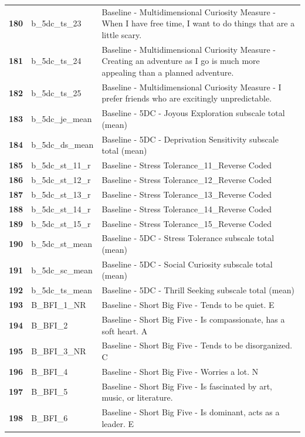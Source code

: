 \documentclass[
  letterpaper,
  DIV=11,
  numbers=noendperiod]{scrartcl}
\begin{document}
\begin{longtable}[t]{>{}cll}
\textbf{180} & b\_5dc\_ts\_23 & Baseline - Multidimensional Curiosity Measure - When I have free time, I want to do things that are a little scary.\\
\addlinespace
\textbf{181} & b\_5dc\_ts\_24 & Baseline - Multidimensional Curiosity Measure - Creating an adventure as I go is much more appealing than a planned adventure.\\
\textbf{182} & b\_5dc\_ts\_25 & Baseline - Multidimensional Curiosity Measure - I prefer friends who are excitingly unpredictable.\\
\textbf{183} & b\_5dc\_je\_mean & Baseline - 5DC - Joyous Exploration subscale total (mean)\\
\textbf{184} & b\_5dc\_ds\_mean & Baseline - 5DC - Deprivation Sensitivity subscale total (mean)\\
\textbf{185} & b\_5dc\_st\_11\_r & Baseline - Stress Tolerance\_11\_Reverse Coded\\
\addlinespace
\textbf{186} & b\_5dc\_st\_12\_r & Baseline - Stress Tolerance\_12\_Reverse Coded\\
\textbf{187} & b\_5dc\_st\_13\_r & Baseline - Stress Tolerance\_13\_Reverse Coded\\
\textbf{188} & b\_5dc\_st\_14\_r & Baseline - Stress Tolerance\_14\_Reverse Coded\\
\textbf{189} & b\_5dc\_st\_15\_r & Baseline - Stress Tolerance\_15\_Reverse Coded\\
\textbf{190} & b\_5dc\_st\_mean & Baseline - 5DC - Stress Tolerance subscale total (mean)\\
\addlinespace
\textbf{191} & b\_5dc\_sc\_mean & Baseline - 5DC - Social Curiosity subscale total (mean)\\
\textbf{192} & b\_5dc\_ts\_mean & Baseline - 5DC - Thrill Seeking subscale total (mean)\\
\textbf{193} & B\_BFI\_1\_NR & Baseline - Short Big Five - Tends to be quiet. E\\
\textbf{194} & B\_BFI\_2 & Baseline - Short Big Five - Is compassionate, has a soft heart. A\\
\textbf{195} & B\_BFI\_3\_NR & Baseline - Short Big Five - Tends to be disorganized. C\\
\addlinespace
\textbf{196} & B\_BFI\_4 & Baseline - Short Big Five - Worries a lot. N\\
\textbf{197} & B\_BFI\_5 & Baseline - Short Big Five - Is fascinated by art, music, or literature.\\
\textbf{198} & B\_BFI\_6 & Baseline - Short Big Five - Is dominant, acts as a leader. E\\

\end{longtable}
\end{document}
